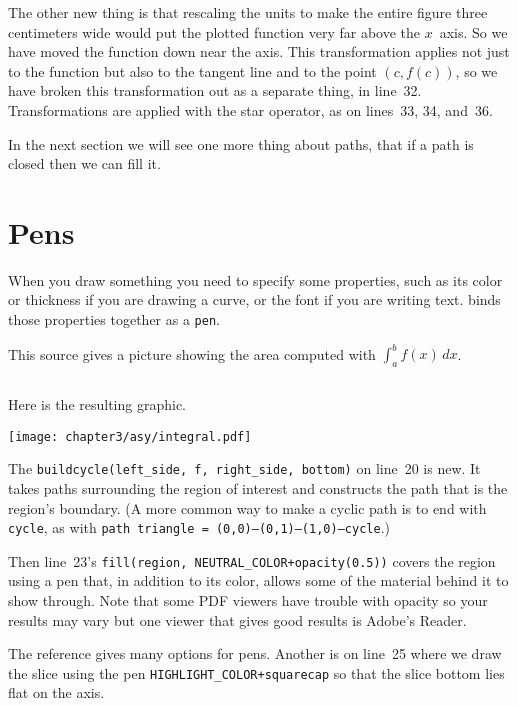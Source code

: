 The other new thing 
is that rescaling the units to make the
entire figure three centimeters wide
would put the plotted function very far above the
$x$~axis.
So we have moved the function down near the axis.
This transformation applies not just to the function but also to the tangent
line and to the point $(c,f(c))$, so we have broken this
transformation out as a separate thing,
in line~32.   
Transformations are applied with the star operator, 
as on lines~33, 34, and~36.

In the next section we will see one more thing about paths, 
that if a path is closed then we can fill it.
 




\section{Pens}
When you draw something you need  to specify some properties, such as its color
or thickness if you are drawing a curve, or the font if you are
writing text.
\Asy{} binds those properties together as a 
\texttt{pen}. 

This source gives a picture showing the area computed with $\int_{a}^{b}f(x)\,dx$.
\begin{center}
  \inputminted{Asymptote}{chapter3/asy/integral.asy}
\end{center}
Here is the resulting graphic.
\begin{center}
  \texttt{[image: chapter3/asy/integral.pdf]}
\end{center}
The    
\texttt{buildcycle(left_side, f, right_side, bottom)}
on line~20 is new.
It takes paths surrounding the region of interest and
constructs the path that is the region's boundary.
(A more common way to make a cyclic path is to end with 
\texttt{cycle}, as with 
\texttt{path triangle = (0,0)--(0,1)--(1,0)--cycle}.)

Then line~23's \texttt{fill(region, NEUTRAL_COLOR+opacity(0.5))} 
covers the region using a pen that, in addition to
its color, allows some of the material behind it to show through.
Note that some PDF viewers have trouble with opacity so your results may vary
but one viewer that gives good results is Adobe's Reader.

The \Asy{} reference gives many options for pens.
Another is on line~25 where we draw the slice
using the pen 
\texttt{HIGHLIGHT_COLOR+squarecap} so that the 
slice bottom lies flat on the axis.

